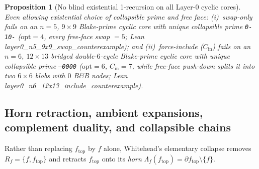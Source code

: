 \documentclass[11pt]{article}
\newtheorem{proposition}[theorem]{Proposition}
\begin{document}
\begin{proposition}[No blind existential 1-recursion on all Layer-0 cyclic cores]
\label{prop:layer0-cex}
Even allowing existential choice of collapsible prime and free face:
(i)~swap-only fails on an $n=5$, $9\times 9$ Blake-prime cyclic core with unique
collapsible prime \texttt{0-10-} ($\mathrm{opt}=4$, every free-face swap $=5$;
Lean \textsf{layer0\_n5\_9x9\_swap\_counterexample}); and
(ii)~force-include ($C_{\mathrm{in}}$) fails on an $n=6$, $12\times 13$ bridged
double-$6$-cycle Blake-prime cyclic core with unique collapsible prime
\texttt{--0000} ($\mathrm{opt}=6$, $C_{\mathrm{in}}=7$, while free-face push-down
splits it into two $6\times 6$ blobs with $0$ B\&B nodes; Lean
\textsf{layer0\_n6\_12x13\_include\_counterexample}).
\end{proposition}

\subsection{Horn retraction, ambient expansions, complement duality, and collapsible chains}
\label{sec:horn-chains}

Rather than replacing $f_{\mathrm{top}}$ by $f$ alone, Whitehead's elementary
collapse removes $R_f=\{f,f_{\mathrm{top}}\}$ and retracts $f_{\mathrm{top}}$ onto
its \emph{horn} $\Lambda_f(f_{\mathrm{top}})=\partial f_{\mathrm{top}}\setminus\{f\}$.
\end{document}
